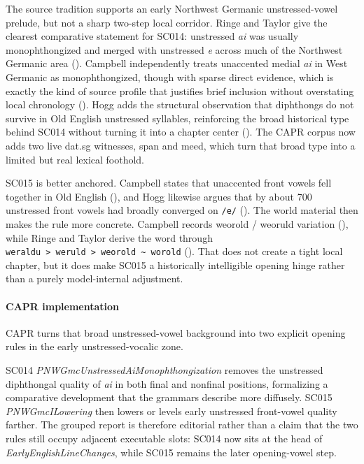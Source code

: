 \documentclass[
  british,
  a4paper,
]{article}
\begin{document}
The source tradition supports an early Northwest Germanic
unstressed-vowel prelude, but not a sharp two-step local corridor. Ringe
and Taylor give the clearest comparative statement for SC014: unstressed
\emph{ai} was usually monophthongized and merged with unstressed
\emph{e} across much of the Northwest Germanic area
().
Campbell independently treats unaccented medial \emph{ai} in West
Germanic as monophthongized, though with sparse direct evidence, which
is exactly the kind of source profile that justifies brief inclusion
without overstating local chronology
(). Hogg adds the
structural observation that diphthongs do not survive in Old English
unstressed syllables, reinforcing the broad historical type behind SC014
without turning it into a chapter center (). The CAPR corpus now adds two live dat.sg witnesses, span
and meed, which turn that broad type into a limited but real lexical
foothold.

SC015 is better anchored. Campbell states that unaccented front vowels
fell together in Old English (), and Hogg likewise argues that by about 700 unstressed front
vowels had broadly converged on \texttt{/e/}
(). The world material then makes
the rule more concrete. Campbell records weorold / weoruld variation
(), while
Ringe and Taylor derive the word through
\texttt{weraldu\ \textgreater{}\ weruld\ \textgreater{}\ weorold\ \textasciitilde{}\ worold}
().
That does not create a tight local chapter, but it does make SC015 a
historically intelligible opening hinge rather than a purely
model-internal adjustment.

\paragraph{CAPR implementation}\label{capr-implementation-11}

CAPR turns that broad unstressed-vowel background into two explicit
opening rules in the early unstressed-vocalic zone.

SC014 \emph{PNWGmcUnstressedAiMonophthongization} removes the unstressed
diphthongal quality of \emph{ai} in both final and nonfinal positions,
formalizing a comparative development that the grammars describe more
diffusely. SC015 \emph{PNWGmcILowering} then lowers or levels early
unstressed front-vowel quality farther. The grouped report is therefore
editorial rather than a claim that the two rules still occupy adjacent
executable slots: SC014 now sits at the head of
\emph{EarlyEnglishLineChanges}, while SC015 remains the later
opening-vowel step.
\end{document}
